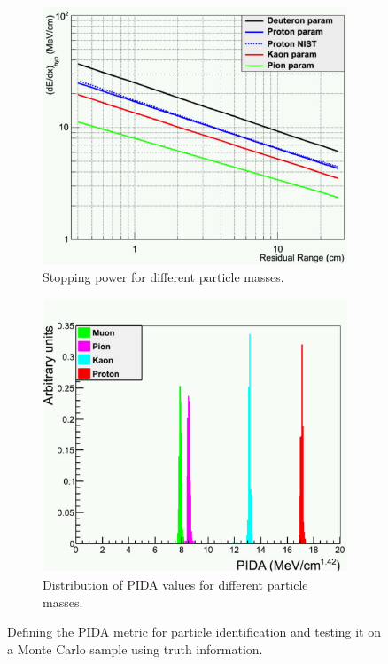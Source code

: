 \begin{figure}[h!]
  \centering
  \begin{subfigure}{0.48\textwidth}
    \centering
    \includegraphics[width=\textwidth]{StoppingPower}
    \caption{Stopping power for different particle masses.}
    \label{fig:PIDA_loglog}
  \end{subfigure}%
  \hspace{0.03\textwidth}%
  \begin{subfigure}{0.48\textwidth}
    \centering
    \includegraphics[width=\textwidth]{TruthPIDA}
    \caption{Distribution of PIDA values for different particle masses.}
    \label{fig:PIDA_MC}
  \end{subfigure}
  \caption[Defining the PIDA metric for particle identification.]
          {Defining the PIDA metric for particle identification and testing it on a Monte Carlo sample using truth information.}
  \label{fig:PIDAPlots}
\end{figure}

